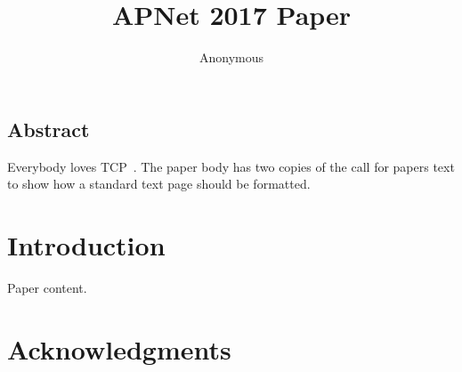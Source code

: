 \documentclass{apnet17}
\begin{document}
 {}
\date{}


\title{APNet 2017 Paper}

\author{Anonymous}

\maketitle


\subsection*{Abstract}

Everybody loves TCP~\cite{vanjacobson}. The paper body has two copies
of the call for papers text to show how a standard text page should be
formatted.

\section{Introduction}

Paper content.

\section*{Acknowledgments}


\begin{small}

\end{small}
\label{last-page}
\end{document}
